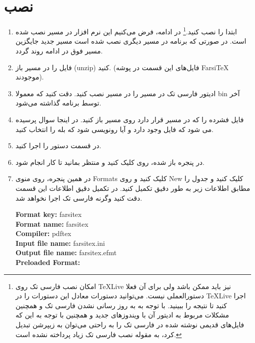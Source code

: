 \section{نصب  }
\baselineskip=1cm
\begin{enumerate}
\item ابتدا  را نصب کنید.\footnote{امکان نصب فارسی تک روی
TeXLive نیز باید ممکن باشد ولی برای آن فعلا دستورالعملی نیست. می‌توانید دستورات معادل
این دستورات را در TeXLive اجرا کنید تا نتیجه را ببینید. با توجه به به روز رسانی نشدن فارسی تک
و همچنین مشکلات مربوط به ادیتور آن با ویندوزهای جدید و همچنین با توجه به این که فایل‌های
قدیمی نوشته شده در فارسی تک را به راحتی می‌توان به زیپرشن تبدیل کرد، به مقوله 
نصب فارسی تک زیاد پرداخته
نشده است.}
 در ادامه، فرض می‌کنیم این نرم افزار در مسیر 
 نصب شده است.
در صورتی که برنامه در مسیر دیگری نصب شده است مسیر جدید جایگزین مسیر فوق در ادامه روند گردد.
\item فایل   را در  مسیر    باز  (unzip)  کنید. 
(فایل‌های این قسمت در پوشه FarsiTeX موجودند).
\item  ادیتور فارسی تک در مسیر    را در مسیر  
نصب کنید. دقت کنید که معمولا bin  آخر توسط برنامه گذاشته می‌شود.
\item  فایل فشرده   را که در مسیر  قرار دارد روی مسیر   
باز کنید. در اینجا سوال پرسیده می شود که فایل وجود دارد و آیا رونویسی شود که بله را انتخاب کنید.
\item  در قسمت  دستور  را اجرا کنید.
\item  در پنجره باز شده، روی  کلیک کنید و منتظر بمانید تا کار انجام شود.
\item  در همین پنجره، روی منوی Formats کلیک کنید و روی New کلیک کنید و جدول را مطابق اطلاعات زیر به طور دقیق تکمیل کنید.
در تکمیل دقیق اطلاعات این قسمت دقت کنید وگرنه فارسی تک اجرا نخواهد شد.
\begin{latin}
{\bf Format key:} {\Large farsitex}\\
{\bf Format name:} {\Large farsitex}\\
{\bf Compiler:} {\Large pdftex}\\
{\bf Input file name:} {\Large farsitex.ini}\\
{\bf Output file name:} {\Large farsitex.efmt}\\
{\bf Preloaded Format:} \\

\end{latin}
\end{enumerate}
